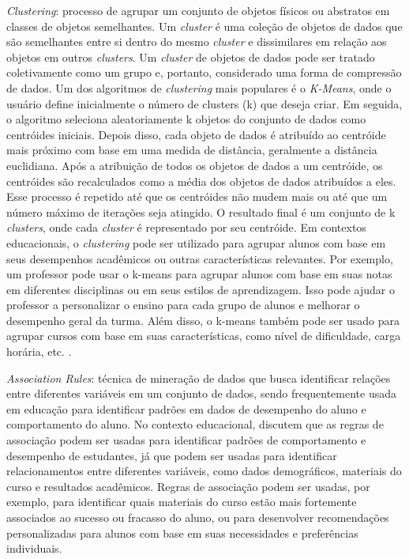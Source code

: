 \begin{enumerate}
    \item {\textit{Clustering}: processo de agrupar um conjunto de objetos físicos ou abstratos em classes de objetos semelhantes. Um \textit{cluster} é uma coleção de objetos de dados que são semelhantes entre si dentro do mesmo \textit{cluster} e dissimilares em relação aos objetos em outros \textit{clusters}. Um \textit{cluster} de objetos de dados pode ser tratado coletivamente como um grupo e, portanto, considerado uma forma de compressão de dados. Um dos algoritmos de \textit{clustering} mais populares é o \textit{K-Means}, onde o usuário define inicialmente o número de clusters (k) que deseja criar. Em seguida, o algoritmo seleciona aleatoriamente k objetos do conjunto de dados como centróides iniciais. Depois disso, cada objeto de dados é atribuído ao centróide mais próximo com base em uma medida de distância, geralmente a distância euclidiana. Após a atribuição de todos os objetos de dados a um centróide, os centróides são recalculados como a média dos objetos de dados atribuídos a eles. Esse processo é repetido até que os centróides não mudem mais ou até que um número máximo de iterações seja atingido. O resultado final é um conjunto de k \textit{clusters}, onde cada \textit{cluster} é representado por seu centróide. Em contextos educacionais, o \textit{clustering} pode ser utilizado para agrupar alunos com base em seus desempenhos acadêmicos ou outras características relevantes. Por exemplo, um professor pode usar o k-means para agrupar alunos com base em suas notas em diferentes disciplinas ou em seus estilos de aprendizagem. Isso pode ajudar o professor a personalizar o ensino para cada grupo de alunos e melhorar o desempenho geral da turma. Além disso, o k-means também pode ser usado para agrupar cursos com base em suas características, como nível de dificuldade, carga horária, etc. \cite{Ali2017KMC}.

    \item \textit{Association Rules}: técnica de mineração de dados que busca identificar relações entre diferentes variáveis em um conjunto de dados, sendo frequentemente usada em educação para identificar padrões em dados de desempenho do aluno e comportamento do aluno. No contexto educacional,  discutem que as regras de associação podem ser usadas para identificar padrões de comportamento e desempenho de estudantes, já que podem ser usadas para identificar relacionamentos entre diferentes variáveis, como dados demográficos, materiais do curso e resultados acadêmicos. Regras de associação podem ser usadas, por exemplo, para identificar quais materiais do curso estão mais fortemente associados ao sucesso ou fracasso do aluno, ou para desenvolver recomendações personalizadas para alunos com base em suas necessidades e preferências individuais.

}
\end{enumerate}
